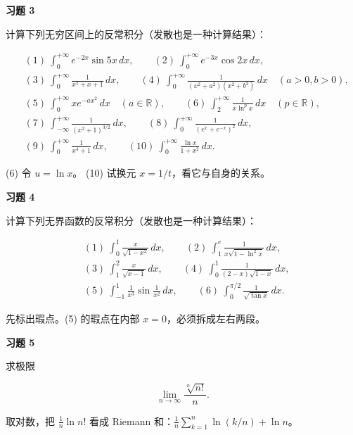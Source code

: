 \begin{exercisebox}
\textbf{习题 3 }

计算下列无穷区间上的反常积分（发散也是一种计算结果）：

\[
      \begin{aligned}
      &(1)\ \int_0^{+\infty}e^{-2x}\sin5x\,dx,\qquad
      (2)\ \int_0^{+\infty}e^{-3x}\cos2x\,dx,\\
      &(3)\ \int_0^{+\infty}\frac{1}{x^2+x+1}\,dx,\qquad
      (4)\ \int_0^{+\infty}\frac{1}{(x^2+a^2)(x^2+b^2)}\,dx\quad(a>0,b>0),\\
      &(5)\ \int_0^{+\infty}xe^{-ax^2}\,dx\quad(a\in\mathbb R),\qquad
      (6)\ \int_2^{+\infty}\frac{1}{x\ln^p x}\,dx\quad(p\in\mathbb R),\\
      &(7)\ \int_{-\infty}^{+\infty}\frac{1}{(x^2+1)^{3/2}}\,dx,\qquad
      (8)\ \int_0^{+\infty}\frac{1}{(e^x+e^{-x})^2}\,dx,\\
      &(9)\ \int_0^{+\infty}\frac{1}{x^4+1}\,dx,\qquad
      (10)\ \int_0^{+\infty}\frac{\ln x}{1+x^2}\,dx.
      \end{aligned}
      \]

\begin{hintbox}
(6) 令 \(u=\ln x\)。 (10) 试换元 \(x=1/t\)，看它与自身的关系。
\end{hintbox}
\end{exercisebox}

\begin{exercisebox}
\textbf{习题 4 }

计算下列无界函数的反常积分（发散也是一种计算结果）：

\[
      \begin{aligned}
      &(1)\ \int_0^1\frac{x}{\sqrt{1-x^2}}\,dx,\qquad
      (2)\ \int_1^e\frac{1}{x\sqrt{1-\ln^2x}}\,dx,\\
      &(3)\ \int_1^2\frac{x}{\sqrt{x-1}}\,dx,\qquad
      (4)\ \int_0^1\frac{1}{(2-x)\sqrt{1-x}}\,dx,\\
      &(5)\ \int_{-1}^1\frac{1}{x^3}\sin\frac{1}{x^2}\,dx,\qquad
      (6)\ \int_0^{\pi/2}\frac{1}{\sqrt{\tan x}}\,dx.
      \end{aligned}
      \]

\begin{hintbox}
先标出瑕点。(5) 的瑕点在内部 \(x=0\)，必须拆成左右两段。
\end{hintbox}
\end{exercisebox}

\begin{exercisebox}
\textbf{习题 5 }

求极限

\[
        \lim_{n\to\infty}\frac{\sqrt[n]{n!}}{n}.
      \]

\begin{hintbox}
取对数，把 \(\frac1n\ln n!\) 看成 Riemann 和：\(\frac1n\sum_{k=1}^n\ln(k/n)+\ln n\)。
\end{hintbox}
\end{exercisebox}

